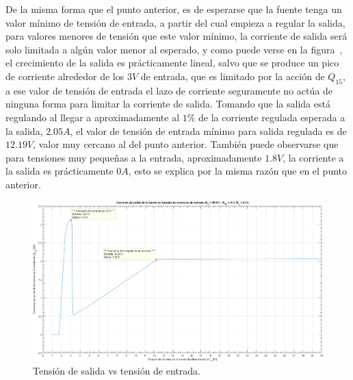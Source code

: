 \vspace{1.5cm}

De la misma forma que el punto anterior, es de esperarse que la fuente tenga un valor mínimo de tensión de entrada, a partir del cual empieza a regular la salida, para valores menores de tensión que este valor mínimo, la corriente de salida será solo limitada a algún valor menor al esperado, y como puede verse en la figura~, el crecimiento de la salida es prácticamente lineal, salvo que se produce un pico de corriente alrededor de los $3 V$ de entrada, que es limitado por la acción de $Q_{15}$, a ese valor de tensión de entrada el lazo de corriente seguramente no actúa de ninguna forma para limitar la corriente de salida. Tomando que la salida está regulando al llegar a aproximadamente al $1 \%$ de la corriente regulada esperada a la salida, $2.05 A$, el valor de tensión de entrada mínimo para salida regulada es de $12.19 V$, valor muy cercano al del punto anterior. También puede observarse que para tensiones muy pequeñas a la entrada, aproximadamente $1.8 V$, la corriente a la salida es prácticamente $0 A$, esto se explica por la misma razón que en el punto anterior.

\vfill

\clearpage

\begin{figure}[H] %
\begin{center}
\includegraphics[width=1.2 \textwidth, angle=90]{./img/preguntas/p19.png}
\caption{\label{fig:fig_p19_io_vs_vi}\footnotesize{Tensión de salida vs tensión de entrada.}}
\end{center}
\end{figure}

\clearpage